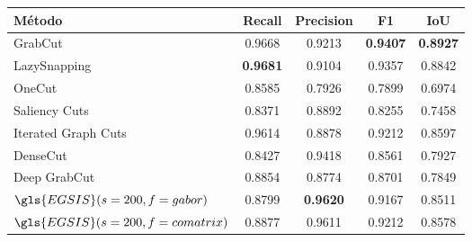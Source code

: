 \begin{table}[!h]
    \centering
  \begin{tabular}{lcccc}
    \toprule
    \textbf{Método}                    & \textbf{Recall} & \textbf{Precision} & \textbf{F1}     & \textbf{IoU} \\
    \midrule \midrule
    GrabCut                            & 0.9668          & 0.9213             & \textbf{0.9407} & \textbf{0.8927}       \\
    LazySnapping                       & \textbf{0.9681} & 0.9104             & 0.9357          & 0.8842       \\
    OneCut                             & 0.8585          & 0.7926             & 0.7899          & 0.6974       \\
    Saliency Cuts                      & 0.8371          & 0.8892             & 0.8255          & 0.7458       \\
    Iterated Graph Cuts\footnotemark{} & 0.9614          & 0.8878             & 0.9212          & 0.8597       \\
    DenseCut                           & 0.8427          & 0.9418             & 0.8561          & 0.7927       \\
    Deep GrabCut                       & 0.8854          & 0.8774             & 0.8701          & 0.7849       \\
    $\gls{EGSIS}(s=200, f=gabor)$      & 0.8799          & \textbf{0.9620}    & 0.9167          & 0.8511       \\
    $\gls{EGSIS}(s=200, f=comatrix)$   & 0.8877          & 0.9611             & 0.9212          & 0.8578       \\
    \bottomrule
  \end{tabular}
\end{table}


